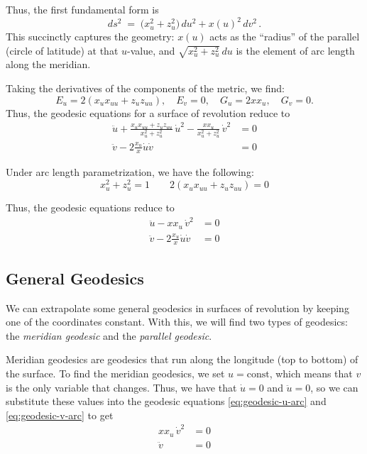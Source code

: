 \documentclass[12pt]{article}
\begin{document}
Thus, the first fundamental form is
\begin{equation}\label{eq:metric-rev}
ds^{2} \;=\; \big(x_{u}^{2} + z_{u}^{2}\big)\,du^{2} + x(u)^{2}\,dv^{2}\,.
\end{equation}
This succinctly captures the geometry: $x(u)$ acts as the “radius” of the parallel (circle of latitude) at that $u$-value, and $\sqrt{x_{u}^{2}+z_{u}^{2}}\,du$ is the element of arc length along the meridian.

Taking the derivatives of the components of the metric, we find:	
\[
E_{u} = 2(x_{u}x_{uu} + z_{u}z_{uu}), \quad E_{v} = 0, \quad G_{u} = 2xx_{u}, \quad G_{v} = 0.
\]
Thus, the geodesic equations for a surface of revolution reduce to
\begin{align}
	\ddot{u} + \frac{x_{u}x_{uu} + z_{u}z_{uu}}{x_{u}^{2} + z_{u}^{2}}\,\dot{u}^2 - \frac{x x_{u}}{x_{u}^{2} + z_{u}^{2}}\,\dot{v}^{2} &= 0 \label{eq:geodesic-u}\\
	\ddot{v} - 2\frac{x_{u}}{x}\dot{u}\dot{v} &= 0 \label{eq:geodesic-v}
\end{align}

Under arc length parametrization, we have the following:
\[
	x_{u}^{2} + z_{u}^{2} = 1 \qquad 2(x_{u}x_{uu} + z_{u}z_{uu}) = 0 
\]

Thus, the geodesic equations reduce to
\begin{align}
	\ddot{u} - x x_{u}\,\dot{v}^{2} &= 0 \label{eq:geodesic-u-arc}\\
	\ddot{v} - 2\frac{x_{u}}{x}\dot{u}\dot{v} &= 0 \label{eq:geodesic-v-arc}
\end{align}

\subsection{General Geodesics}
We can extrapolate some general geodesics in surfaces of revolution by keeping one of the coordinates constant.
With this, we will find two types of geodesics: the \emph{meridian geodesic} and the \emph{parallel geodesic}.

Meridian geodesics are geodesics that run along the longitude (top to bottom) of the surface.
To find the meridian geodesics, we set $u = \text{const}$, which means that $v$ is the only variable that changes.
Thus, we have that $\dot{u} = 0$ and $\ddot{u} = 0$, so we can substitute these values into the geodesic equations \eqref{eq:geodesic-u-arc} and \eqref{eq:geodesic-v-arc} to get
\begin{align*}
	x x_{u}\,\dot{v}^{2} &= 0\\
	\ddot{v} &= 0 
\end{align*}
\end{document}
